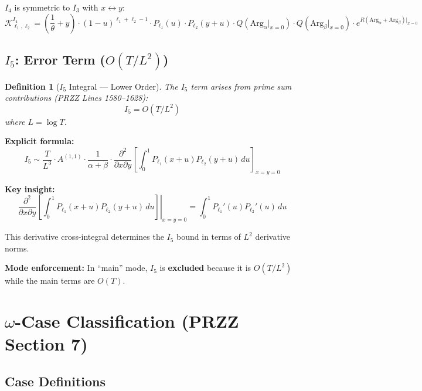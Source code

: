 \documentclass[11pt]{article}
\newtheorem{definition}{Definition}
\begin{document}
$I_4$ is symmetric to $I_3$ with $x \leftrightarrow y$:
\begin{equation}
\mathcal{K}^{I_4}_{\ell_1,\ell_2} = \left(\frac{1}{\theta} + y\right) \cdot (1-u)^{\ell_1+\ell_2-1} \cdot P_{\ell_1}(u) \cdot P_{\ell_2}(y+u) \cdot Q(\text{Arg}_\alpha|_{x=0}) \cdot Q(\text{Arg}_\beta|_{x=0}) \cdot e^{R(\text{Arg}_\alpha+\text{Arg}_\beta)|_{x=0}}
\end{equation}

\subsection{$I_5$: Error Term ($O(T/L^2)$)}

\begin{definition}[$I_5$ Integral --- Lower Order]
The $I_5$ term arises from prime sum contributions (PRZZ Lines 1580--1628):
\begin{equation}
I_5 = O(T/L^2)
\end{equation}
where $L = \log T$.
\end{definition}

\textbf{Explicit formula:}
\begin{equation}
I_5 \sim \frac{T}{L^3} \cdot A^{(1,1)} \cdot \frac{1}{\alpha+\beta} \cdot \frac{\partial^2}{\partial x \partial y}\left[\int_0^1 P_{\ell_1}(x+u) P_{\ell_2}(y+u) \, du\right]_{x=y=0}
\end{equation}

\textbf{Key insight:}
\begin{equation}
\left.\frac{\partial^2}{\partial x \partial y}\left[\int_0^1 P_{\ell_1}(x+u) P_{\ell_2}(y+u) \, du\right]\right|_{x=y=0} = \int_0^1 P_{\ell_1}'(u) P_{\ell_2}'(u) \, du
\end{equation}

This derivative cross-integral determines the $I_5$ bound in terms of $L^2$ derivative norms.

\textbf{Mode enforcement:} In ``main'' mode, $I_5$ is \textbf{excluded} because it is $O(T/L^2)$ while the main terms are $O(T)$.

\section{$\omega$-Case Classification (PRZZ Section 7)}
\label{sec:omega}

\subsection{Case Definitions}
\end{document}
